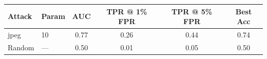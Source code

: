 \begin{tabular}{llcccc}
\toprule
Attack & Param & AUC & TPR @ 1\% FPR & TPR @ 5\% FPR & Best Acc \\
\midrule
jpeg & 10 & 0.77 & 0.26 & 0.44 & 0.74 \\
Random & — & 0.50 & 0.01 & 0.05 & 0.50 \\
\bottomrule
\end{tabular}
